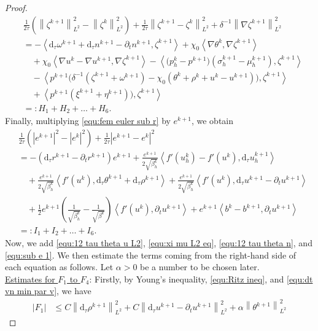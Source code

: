 \documentclass[11pt, reqno]{amsart}
\theoremstyle{definition}
\numberwithin{equation}{section}
\newcommand{\dtt}{\mathrm{d}_\tau}
\newcommand{\norm}[2]{\left\|{#1}\right\|_{#2}}
\newcommand{\inpro}[2]{\left\langle#1,#2\right\rangle}
\newcommand{\abs}[1]{\left|{#1}\right|}
\begin{document}
\begin{proof}
\begin{align}
	&\frac{1}{2\tau} \left(\norm{\zeta^{k+1}}{L^2}^2 - \norm{\zeta^k}{L^2}^2 \right)
	+
	\frac{1}{2\tau} \norm{\zeta^{k+1}-\zeta^k}{L^2}^2
	+
	\delta^{-1} \norm{\nabla \zeta^{k+1}}{L^2}^2
	\nonumber\\
	&=
	-\inpro{\dtt \omega^{k+1}+ \dtt n^{k+1}-\partial_t n^{k+1}}{\zeta^{k+1}}
	+\chi_0 \inpro{\nabla \theta^k}{\nabla \zeta^{k+1}}
	\nonumber\\
	&\quad
	+\chi_0 \inpro{\nabla u^k-\nabla u^{k+1}}{\nabla \zeta^{k+1}}
	-
	\inpro{\big(p_h^k- p^{k+1}\big) (\sigma_h^{k+1}-\mu_h^{k+1})}{\zeta^{k+1}}
	\nonumber\\
	&\quad
	-
	\inpro{p^{k+1} \big(\delta^{-1}(\zeta^{k+1}+\omega^{k+1}) - \chi_0(\theta^k+\rho^k+u^k-u^{k+1})\big)}{\zeta^{k+1}}
	\nonumber\\
	&\quad
	+ \inpro{p^{k+1} (\xi^{k+1}+\eta^{k+1})\big)}{\zeta^{k+1}}
	\nonumber\\
	&=: H_1+H_2+\ldots+H_6.
\end{align}
Finally, multiplying \eqref{equ:fem euler sub r} by $e^{k+1}$, we obtain
\begin{align}\label{equ:sub e 1}
	&\frac{1}{2\tau} \left(\abs{e^{k+1}}^2 - \abs{e^k}^2 \right)
	+
	\frac{1}{2\tau} \abs{e^{k+1}-e^k}^2
	\nonumber\\
	&=
	-
	(\dtt r^{k+1}-\partial_t r^{k+1}) e^{k+1}
	+
	\frac{e^{k+1}}{2\sqrt{\beta_h^k}}
	\inpro{f'(u_h^k)-f'(u^k)}{\dtt u_h^{k+1}}
	\nonumber\\
	&\quad
	+
	\frac{e^{k+1}}{2\sqrt{\beta_h^k}} \inpro{f'(u^k)}{\dtt\theta^{k+1} + \dtt \rho^{k+1}}
	+
	\frac{e^{k+1}}{2\sqrt{\beta_h^k}}
	\inpro{f'(u^k)}{\dtt u^{k+1}-\partial_t u^{k+1}}
	\nonumber\\
	&\quad
	+
	\frac12  e^{k+1} \left(\frac{1}{\sqrt{\beta_h^k}} - \frac{1}{\sqrt{\beta^k}}\right) \inpro{f'(u^k)}{\partial_t u^{k+1}}
	+
	e^{k+1} \inpro{b^k-b^{k+1}}{\partial_t u^{k+1}}
	\nonumber\\
	&=:I_1+I_2+\ldots+I_6.
\end{align}
Now, we add \eqref{equ:12 tau theta u L2}, \eqref{equ:xi mu L2 eq}, \eqref{equ:12 tau theta n}, and \eqref{equ:sub e 1}. We then estimate the terms coming from the right-hand side of each equation as follows. Let $\alpha>0$ be a number to be chosen later.
\\[2ex]
\underline{Estimates for $F_1$ to $F_4$}: Firstly, by Young's inequality, \eqref{equ:Ritz ineq}, and \eqref{equ:dt vn min par v}, we have
\begin{align*}
	\abs{F_1} &\leq
	C \norm{\dtt \rho^{k+1}}{L^2}^2 + C\norm{\dtt u^{k+1}-\partial_t u^{k+1}}{L^2}^2 + \alpha \norm{\theta^{k+1}}{L^2}^2

\end{align*}
\end{proof}
\end{document}
